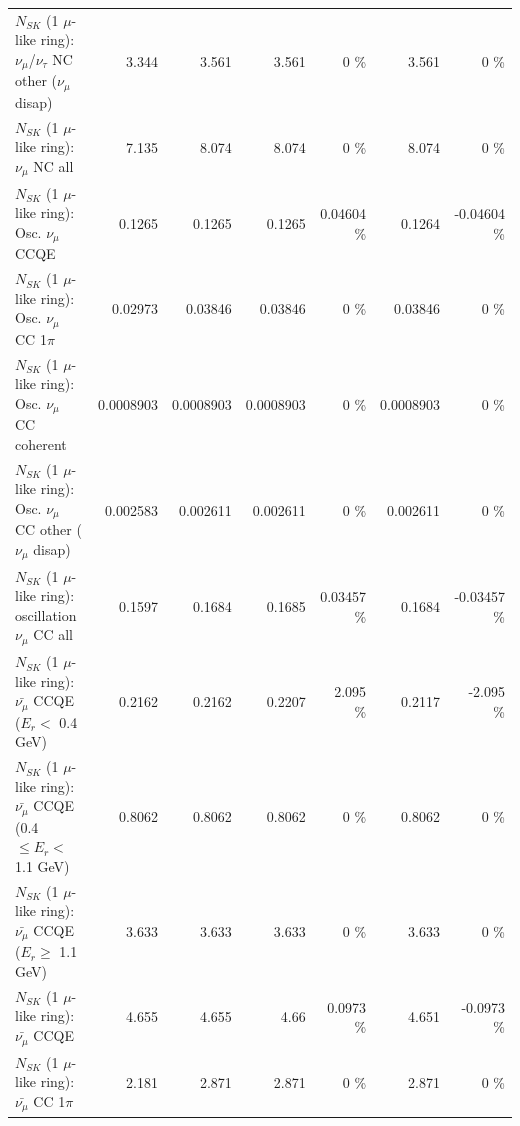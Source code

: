 \begin{table}
\begin{tabular}{| l | r | r | r  r | r  r |}
   $N_{SK}$ (1 $\mu$-like ring): $\nu_\mu$/$\nu_\tau$ NC other ($\nu_\mu$ disap) &           3.344 &           3.561 &           3.561 &        0 \%  &           3.561 &        0 \%  \\ 
                                $N_{SK}$ (1 $\mu$-like ring): $\nu_{\mu}$ NC all &           7.135 &           8.074 &           8.074 &        0 \%  &           8.074 &        0 \%  \\ 
\hline
\hline
                               $N_{SK}$ (1 $\mu$-like ring): Osc. $\nu_\mu$ CCQE &          0.1265 &          0.1265 &          0.1265 &  0.04604 \%  &          0.1264 & -0.04604 \%  \\ 
                          $N_{SK}$ (1 $\mu$-like ring): Osc. $\nu_\mu$ CC 1$\pi$ &         0.02973 &         0.03846 &         0.03846 &        0 \%  &         0.03846 &        0 \%  \\ 
                        $N_{SK}$ (1 $\mu$-like ring): Osc. $\nu_\mu$ CC coherent &       0.0008903 &       0.0008903 &       0.0008903 &        0 \%  &       0.0008903 &        0 \%  \\ 
         $N_{SK}$ (1 $\mu$-like ring): Osc. $\nu_\mu$ CC other ($\nu_\mu$ disap) &        0.002583 &        0.002611 &        0.002611 &        0 \%  &        0.002611 &        0 \%  \\ 
                      $N_{SK}$ (1 $\mu$-like ring): oscillation $\nu_\mu$ CC all &          0.1597 &          0.1684 &          0.1685 &  0.03457 \%  &          0.1684 & -0.03457 \%  \\ 
\hline
\hline
          $N_{SK}$ (1 $\mu$-like ring): $\bar{\nu_\mu}$ CCQE ($E_{r} <$ 0.4 GeV) &          0.2162 &          0.2162 &          0.2207 &    2.095 \%  &          0.2117 &   -2.095 \%  \\ 
 $N_{SK}$ (1 $\mu$-like ring): $\bar{\nu_\mu}$ CCQE (0.4 $\leq E_{r} <$ 1.1 GeV) &          0.8062 &          0.8062 &          0.8062 &        0 \%  &          0.8062 &        0 \%  \\ 
       $N_{SK}$ (1 $\mu$-like ring): $\bar{\nu_\mu}$ CCQE ($E_{r} \geq$ 1.1 GeV) &           3.633 &           3.633 &           3.633 &        0 \%  &           3.633 &        0 \%  \\ 
\hline
                              $N_{SK}$ (1 $\mu$-like ring): $\bar{\nu_\mu}$ CCQE &           4.655 &           4.655 &            4.66 &   0.0973 \%  &           4.651 &  -0.0973 \%  \\ 
                         $N_{SK}$ (1 $\mu$-like ring): $\bar{\nu_\mu}$ CC 1$\pi$ &           2.181 &           2.871 &           2.871 &        0 \%  &           2.871 &        0 \%  \\ 

\end{tabular}
\end{table}
